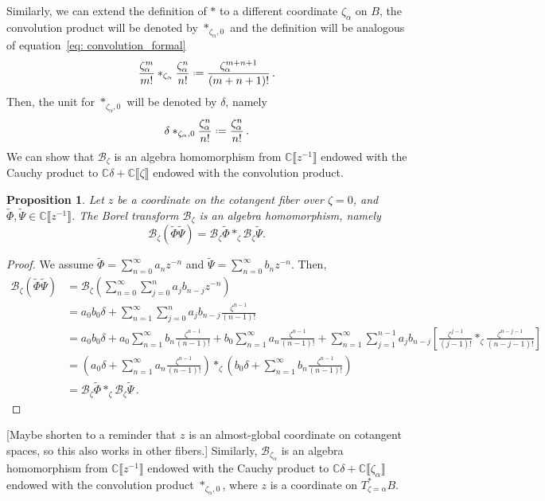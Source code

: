 \documentclass{article}
\newcommand{\C}{\mathbb{C}}
\newcommand{\series}[1]{\tilde{#1}}
\newcommand*{\defeq}{\mathrel{\vcenter{\baselineskip0.5ex \lineskiplimit0pt
                     \hbox{\scriptsize.}\hbox{\scriptsize.}}}%
                     =}
\newcommand{\borel}{\mathcal{B}}
\theoremstyle{definition}
\theoremstyle{plain}
\newtheorem{prop}[definition]{Proposition}
\newenvironment{todo}{\color{Coral}}{\color{black}}
\begin{document}
Similarly, we can extend the definition of $\ast$ to a different coordinate $\zeta_\alpha$ on $B$, the convolution product will be denoted by $\ast_{\zeta_\alpha,0}$ and the definition will be analogous of equation~\eqref{eq: convolution_formal}
\begin{equation}
\frac{\zeta_\alpha^m}{m!} \ast_{\zeta_\alpha} \frac{\zeta_\alpha^n}{n!} \defeq \frac{\zeta_\alpha^{m+n+1}}{(m+n+1)!} \,.
\end{equation}
Then, the unit for $\ast_{\zeta_\alpha,0}$ will be denoted by $\delta$, namely \[\delta\ast_{\zeta_\alpha,0}\frac{\zeta_\alpha^n}{n!}\defeq\frac{\zeta_\alpha^n}{n!}\,.\]
We can show that $\borel_\zeta$ is an algebra homomorphism from $\C\llbracket z^{-1}\rrbracket$ endowed with the Cauchy product to $\C\delta+\C\llbracket\zeta\rrbracket$ endowed with the convolution product.
\begin{prop}
    Let $z$ be a coordinate on the cotangent fiber over $\zeta=0$, and $\series{\Phi},\series{\Psi}\in\C\llbracket z^{-1}\rrbracket$. The Borel transform $\borel_\zeta$ is an algebra homomorphism, namely
    \[\borel_\zeta(\series{\Phi}\series{\Psi})=\borel_\zeta\series{\Phi} \ast_\zeta \borel_\zeta\series{\Psi}.\]
\end{prop}
\begin{proof}
    We assume $\series{\Phi}=\sum_{n=0}^\infty a_nz^{-n}$ and $\series{\Psi}=\sum_{n=0}^\infty b_nz^{-n}$. Then,
    \begin{align*}
\borel_\zeta(\series{\Phi}\series{\Psi})&=\borel_\zeta\left(\sum_{n=0}^\infty\sum_{j=0}^na_jb_{n-j}z^{-n}\right)\\
&=a_0b_0\delta +\sum_{n=1}^\infty\sum_{j=0}^na_jb_{n-j}\frac{\zeta^{n-1}}{(n-1)!}\\
&=a_0b_0\delta+a_0\sum_{n=1}^\infty b_{n}\frac{\zeta^{n-1}}{(n-1)!}+b_0\sum_{n=1}^\infty a_n\frac{\zeta^{n-1}}{(n-1)!}+\sum_{n=1}^\infty\sum_{j=1}^{n-1}a_jb_{n-j}\left[\frac{\zeta^{j-1}}{(j-1)!} \ast_\zeta \frac{\zeta^{n-j-1}}{(n-j-1)!}\right]\\
&=\left(a_0\delta+\sum_{n=1}^\infty a_n\frac{\zeta^{n-1}}{(n-1)!}\right)\ast_\zeta\left(b_0\delta+\sum_{n=1}^\infty b_n\frac{\zeta^{n-1}}{(n-1)!}\right)\\
&=\borel_\zeta\series{\Phi} \ast_\zeta \borel_\zeta\series{\Psi}\,.
\end{align*}
\end{proof}
\begin{todo}[Maybe shorten to a reminder that $z$ is an almost-global coordinate on cotangent spaces, so this also works in other fibers.]\end{todo} Similarly, $\borel_{\zeta_\alpha}$ is an algebra homomorphism from $\C\llbracket z^{-1}\rrbracket$ endowed with the Cauchy product to $\C\delta+\C\llbracket\zeta_\alpha\rrbracket$ endowed with the convolution product $\ast_{\zeta_\alpha,0}$, where $z$ is a coordinate on $T^*_{\zeta=\alpha}B$. %
\end{document}
